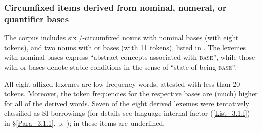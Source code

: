 \subsubsection[Circumfixed items derived from nominal, {numeral}, or {quantifier} bases]{Circumfixed items derived from nominal, {numeral}, or {quantifier} bases}\label{Para_3.1.7.2}

The corpus includes six \textitbf{-}/\textitbf{-}-circumfixed nouns with nominal bases (with eight tokens), and two nouns with  or  bases (with 11 tokens), listed in . The lexemes with nominal bases express ``abstract concepts associated with \textsc{base}'', while those with  or  bases denote stable conditions in the sense of ``state of being \textsc{base}''.



All eight affixed lexemes are low frequency words, attested with less than 20 tokens. Moreover, the token frequencies for the respective bases are (much) higher for all of the derived words. Seven of the eight derived lexemes were tentatively classified as SI-borrowings (for details see language internal factor (\ref{List_3.1.f}) in §\ref{Para_3.1.1}, p. \pageref{List_3.1.f}); in  these items are underlined.

